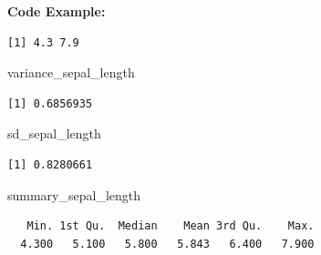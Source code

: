 \documentclass[
  letterpaper,
  DIV=11,
  numbers=noendperiod]{scrreprt}
\newenvironment{Shaded}{\begin{snugshade}}{\end{snugshade}}
\newcommand{\CommentTok}[1]{\textcolor[rgb]{0.37,0.37,0.37}{#1}}
\newcommand{\FunctionTok}[1]{\textcolor[rgb]{0.28,0.35,0.67}{#1}}
\newcommand{\NormalTok}[1]{\textcolor[rgb]{0.00,0.23,0.31}{#1}}
\newcommand{\OtherTok}[1]{\textcolor[rgb]{0.00,0.23,0.31}{#1}}
\newcommand{\SpecialCharTok}[1]{\textcolor[rgb]{0.37,0.37,0.37}{#1}}
\begin{document}
\textbf{Code Example:}

\begin{Shaded}
\end{Shaded}

\begin{verbatim}
[1] 4.3 7.9
\end{verbatim}

\begin{Shaded}
\begin{Highlighting}[]
\NormalTok{variance\_sepal\_length}
\end{Highlighting}
\end{Shaded}

\begin{verbatim}
[1] 0.6856935
\end{verbatim}

\begin{Shaded}
\begin{Highlighting}[]
\NormalTok{sd\_sepal\_length}
\end{Highlighting}
\end{Shaded}

\begin{verbatim}
[1] 0.8280661
\end{verbatim}

\begin{Shaded}
\begin{Highlighting}[]
\NormalTok{summary\_sepal\_length}
\end{Highlighting}
\end{Shaded}

\begin{verbatim}
   Min. 1st Qu.  Median    Mean 3rd Qu.    Max. 
  4.300   5.100   5.800   5.843   6.400   7.900 
\end{verbatim}
\end{document}
